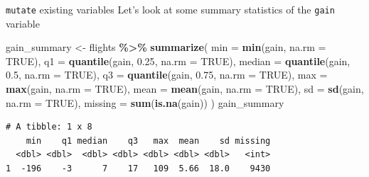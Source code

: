 \documentclass[
  ignorenonframetext,
]{beamer}
\newenvironment{Shaded}{\begin{snugshade}}{\end{snugshade}}
\newcommand{\AttributeTok}[1]{\textcolor[rgb]{0.13,0.29,0.53}{#1}}
\newcommand{\ConstantTok}[1]{\textcolor[rgb]{0.56,0.35,0.01}{#1}}
\newcommand{\FloatTok}[1]{\textcolor[rgb]{0.00,0.00,0.81}{#1}}
\newcommand{\FunctionTok}[1]{\textcolor[rgb]{0.13,0.29,0.53}{\textbf{#1}}}
\newcommand{\NormalTok}[1]{#1}
\newcommand{\OtherTok}[1]{\textcolor[rgb]{0.56,0.35,0.01}{#1}}
\newcommand{\SpecialCharTok}[1]{\textcolor[rgb]{0.81,0.36,0.00}{\textbf{#1}}}
\begin{document}
\begin{frame}[fragile]{\texttt{mutate} existing variables}
\protect\hypertarget{mutate-existing-variables-4}{}
Let's look at some summary statistics of the \texttt{gain} variable

\tiny

\begin{Shaded}
\begin{Highlighting}[]
\NormalTok{gain\_summary }\OtherTok{\textless{}{-}}\NormalTok{ flights }\SpecialCharTok{\%\textgreater{}\%} 
  \FunctionTok{summarize}\NormalTok{(}
    \AttributeTok{min =} \FunctionTok{min}\NormalTok{(gain, }\AttributeTok{na.rm =} \ConstantTok{TRUE}\NormalTok{),}
    \AttributeTok{q1 =} \FunctionTok{quantile}\NormalTok{(gain, }\FloatTok{0.25}\NormalTok{, }\AttributeTok{na.rm =} \ConstantTok{TRUE}\NormalTok{),}
    \AttributeTok{median =} \FunctionTok{quantile}\NormalTok{(gain, }\FloatTok{0.5}\NormalTok{, }\AttributeTok{na.rm =} \ConstantTok{TRUE}\NormalTok{),}
    \AttributeTok{q3 =} \FunctionTok{quantile}\NormalTok{(gain, }\FloatTok{0.75}\NormalTok{, }\AttributeTok{na.rm =} \ConstantTok{TRUE}\NormalTok{),}
    \AttributeTok{max =} \FunctionTok{max}\NormalTok{(gain, }\AttributeTok{na.rm =} \ConstantTok{TRUE}\NormalTok{),}
    \AttributeTok{mean =} \FunctionTok{mean}\NormalTok{(gain, }\AttributeTok{na.rm =} \ConstantTok{TRUE}\NormalTok{),}
    \AttributeTok{sd =} \FunctionTok{sd}\NormalTok{(gain, }\AttributeTok{na.rm =} \ConstantTok{TRUE}\NormalTok{),}
    \AttributeTok{missing =} \FunctionTok{sum}\NormalTok{(}\FunctionTok{is.na}\NormalTok{(gain))}
\NormalTok{  )}
\NormalTok{gain\_summary}
\end{Highlighting}
\end{Shaded}

\begin{verbatim}
# A tibble: 1 x 8
    min    q1 median    q3   max  mean    sd missing
  <dbl> <dbl>  <dbl> <dbl> <dbl> <dbl> <dbl>   <int>
1  -196    -3      7    17   109  5.66  18.0    9430
\end{verbatim}

\normalsize
\end{frame}
\end{document}
